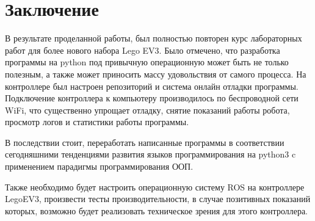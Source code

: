 \documentclass[a4paper,14pt]{extreport}
\begin{document}
	\newpage
	\section*{Заключение}
	
	В результате проделанной работы, был полностью повторен курс лабораторных работ для более нового набора Lego EV3. Было отмечено, что разработка программы на python под привычную операционную может быть не только полезным, а также может приносить массу удовольствия от самого процесса. На контроллере был настроен репозиторий и система онлайн отладки программы. Подключение контроллера к компьютеру производилось по беспроводной сети WiFi, что существенно упрощает отладку, снятие показаний работы робота, просмотр логов и статистики работы программы.
	
	В последствии стоит, переработать написанные программы в соответствии сегодняшними тенденциями развития языков программирования на python3 c применением парадигмы программирования ООП.
	
	Также необходимо будет настроить операционную систему ROS на контроллере LegoEV3, произвести тесты производительности, в случае позитивных показаний которых, возможно будет реализовать техническое зрения для этого контроллера.
	
	
\end{document}
